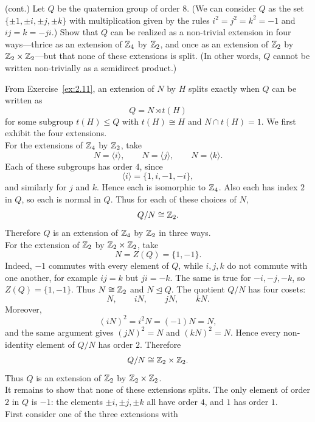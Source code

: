 \documentclass[../Odyssey_Project.tex]{subfiles}
\begin{document}
\begin{exercise}
\label{ex:2.12}
(cont.) Let $Q$ be the quaternion group of order 8. (We can consider $Q$ as the set $\{\pm 1, \pm i, \pm j, \pm k\}$ with multiplication given by the rules $i^2 = j^2 = k^2 = -1$ and $ij = k = -ji$.) Show that $Q$ can be realized as a non-trivial extension in four ways---thrice as an extension of $\mathbb{Z}_4$ by $\mathbb{Z}_2$, and once as an extension of $\mathbb{Z}_2$ by $\mathbb{Z}_2 \times \mathbb{Z}_2$---but that none of these extensions is split. (In other words, $Q$ cannot be written non-trivially as a semidirect product.)
\end{exercise}
\begin{solution}
    From Exercise~\ref{ex:2.11}, an extension of $N$ by $H$ splits exactly when $Q$ can be written as
    \[
        Q = N \rtimes t(H)
    \]
    for some subgroup $t(H) \leq Q$ with $t(H) \cong H$ and $N \cap t(H) = 1$. We first exhibit the four extensions. \\
    For the extensions of $\mathbb{Z}_4$ by $\mathbb{Z}_2$, take
    \[
        N = \langle i\rangle,
        \qquad
        N = \langle j\rangle,
        \qquad
        N = \langle k\rangle.
    \]
    Each of these subgroups has order $4$, since
    \[
        \langle i\rangle = \{1,i,-1,-i\},
    \]
    and similarly for $j$ and $k$. Hence each is isomorphic to $\mathbb{Z}_4$. Also each has index $2$ in $Q$, so each is normal in $Q$. Thus for each of these choices of $N$,
    \[
        Q/N \cong \mathbb{Z}_2.
    \]
    Therefore $Q$ is an extension of $\mathbb{Z}_4$ by $\mathbb{Z}_2$ in three ways. \\
    For the extension of $\mathbb{Z}_2$ by $\mathbb{Z}_2 \times \mathbb{Z}_2$, take
    \[
        N = Z(Q) = \{1,-1\}.
    \]
    Indeed, $-1$ commutes with every element of $Q$, while $i,j,k$ do not commute with one another, for example $ij = k$ but $ji = -k$. The same is true for $-i,-j,-k$, so $Z(Q) = \{1,-1\}$. Thus $N \cong \mathbb{Z}_2$ and $N \trianglelefteq Q$. The quotient $Q/N$ has four cosets:
    \[
        N,\qquad iN,\qquad jN,\qquad kN.
    \]
    Moreover,
    \[
        (iN)^2 = i^2N = (-1)N = N,
    \]
    and the same argument gives $(jN)^2 = N$ and $(kN)^2 = N$. Hence every non-identity element of $Q/N$ has order $2$. Therefore
    \[
        Q/N \cong \mathbb{Z}_2 \times \mathbb{Z}_2.
    \]
    Thus $Q$ is an extension of $\mathbb{Z}_2$ by $\mathbb{Z}_2 \times \mathbb{Z}_2$. \\
    It remains to show that none of these extensions splits. The only element of order $2$ in $Q$ is $-1$: the elements $\pm i,\pm j,\pm k$ all have order $4$, and $1$ has order $1$. \\
    First consider one of the three extensions with

\end{solution}
\end{document}
